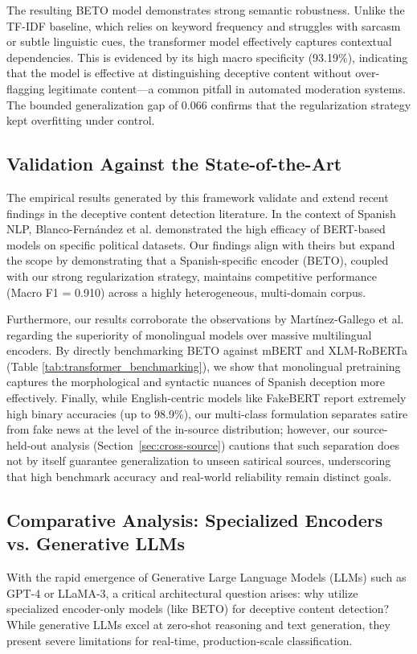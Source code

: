 \documentclass[informatics,article,accept,pdftex,moreauthors]{Definitions/mdpi}
\begin{document}
The resulting BETO model demonstrates strong semantic robustness. Unlike the TF-IDF baseline, which relies on keyword frequency and struggles with sarcasm or subtle linguistic cues, the transformer model effectively captures contextual dependencies. This is evidenced by its high macro specificity (93.19\%), indicating that the model is effective at distinguishing deceptive content without over-flagging legitimate content—a common pitfall in automated moderation systems. The bounded generalization gap of 0.066 confirms that the regularization strategy kept overfitting under control.

\subsection{Validation Against the State-of-the-Art}
The empirical results generated by this framework validate and extend recent findings in the deceptive content detection literature. In the context of Spanish NLP, Blanco-Fernández et al. \citep{blanco2024enhancing} demonstrated the high efficacy of BERT-based models on specific political datasets. Our findings align with theirs but expand the scope by demonstrating that a Spanish-specific encoder (BETO), coupled with our strong regularization strategy, maintains competitive performance (Macro F1 = 0.910) across a highly heterogeneous, multi-domain corpus. 

Furthermore, our results corroborate the observations by Martínez-Gallego et al. \citep{martinez2021fake} regarding the superiority of monolingual models over massive multilingual encoders. By directly benchmarking BETO against mBERT and XLM-RoBERTa (Table \ref{tab:transformer_benchmarking}), we show that monolingual pretraining captures the morphological and syntactic nuances of Spanish deception more effectively. Finally, while English-centric models like FakeBERT \citep{kaliyar2021fakebert} report extremely high binary accuracies (up to 98.9\%), our multi-class formulation separates satire from fake news at the level of the in-source distribution; however, our source-held-out analysis (Section~\ref{sec:cross-source}) cautions that such separation does not by itself guarantee generalization to unseen satirical sources, underscoring that high benchmark accuracy and real-world reliability remain distinct goals.

\subsection{Comparative Analysis: Specialized Encoders vs. Generative LLMs}
With the rapid emergence of Generative Large Language Models (LLMs) such as GPT-4 or LLaMA-3, a critical architectural question arises: why utilize specialized encoder-only models (like BETO) for deceptive content detection? While generative LLMs excel at zero-shot reasoning and text generation, they present severe limitations for real-time, production-scale classification. 
\end{document}
